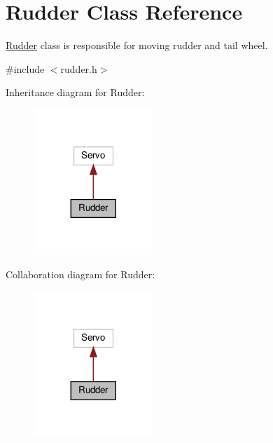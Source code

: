 \hypertarget{class_rudder}{}\section{Rudder Class Reference}
\label{class_rudder}


\hyperlink{class_rudder}{Rudder} class is responsible for moving rudder and tail wheel.  




{\ttfamily \#include $<$rudder.\+h$>$}



Inheritance diagram for Rudder\+:
\nopagebreak
\begin{figure}[H]
\begin{center}
\leavevmode
\includegraphics[width=128pt]{class_rudder__inherit__graph}
\end{center}
\end{figure}


Collaboration diagram for Rudder\+:
\nopagebreak
\begin{figure}[H]
\begin{center}
\leavevmode
\includegraphics[width=128pt]{class_rudder__coll__graph}
\end{center}
\end{figure}
